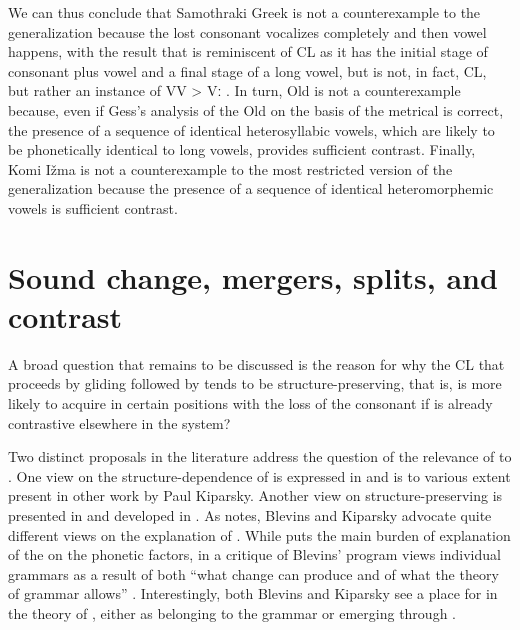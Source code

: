 \documentclass[output=paper,
modfonts
]{LSP/langsci}
\begin{document}
We can thus conclude that Samothraki Greek is not a counterexample to
the generalization because the lost consonant vocalizes completely and
then vowel  happens, with the result that is reminiscent of
CL as it has the initial stage of consonant plus vowel and a final stage
of a long vowel, but is not, in fact, CL, but rather an instance of VV
\textgreater{} Vː . In turn, Old  is not a
counterexample because, even if Gess's analysis of the Old  on the
basis of the metrical  is correct, the presence of a sequence of
identical heterosyllabic vowels, which are likely to be phonetically
identical to long vowels, provides sufficient contrast. Finally, Komi
Ižma is not a counterexample to the most restricted version of the
generalization because the presence of a sequence of identical
heteromorphemic vowels is sufficient contrast.

\section{Sound change, mergers, splits, and contrast}
\largerpage
A broad question that remains to be discussed is the reason for why the
CL  that proceeds by gliding followed by 
\citep{deChene1979} tends to be structure-preserving, that is,
is more likely to acquire  in certain positions with the
loss of the consonant if  is already contrastive elsewhere
in the system?

Two distinct proposals in the literature address the question of the
relevance of  to . One view on the
structure-dependence of  is expressed in \citet{kiparsky1995,kiparsky2003} and is to various extent present in other work by Paul Kiparsky.
Another view on structure-preserving  is presented in
\citet{blevins2004a} and developed in \citet{blevins2009k}. As \citet{anderson2016k}
notes, Blevins and Kiparsky advocate quite different views on the
explanation of . While \citet{blevins2004a,blevins2006b} puts the main
burden of explanation of the  on the phonetic factors,
\citet{kiparsky2006} in a critique of Blevins' program views individual
grammars as a result of both ``what change can produce and of what the
theory of grammar allows'' \citep[17]{anderson2016k}. Interestingly, both
Blevins and Kiparsky see a place for  in the
theory of , either as belonging to the grammar \citep{kiparsky1995,kiparsky2003} or emerging through  \citep{blevins2004a,blevins2009k}.
\end{document}
